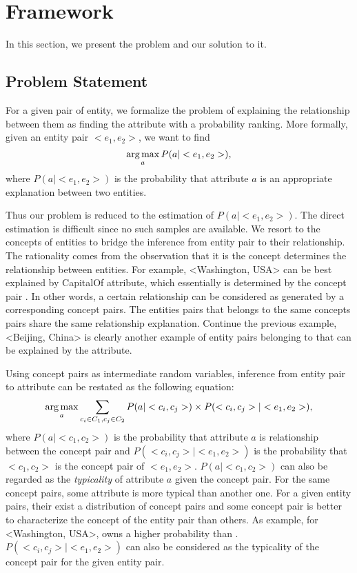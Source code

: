 
\section{Framework}


In this section, we present the problem and our solution to it.

\subsection{Problem Statement}

For a given pair of entity, we formalize the problem of explaining the relationship between them as finding the attribute with a probability ranking. More formally, given an entity pair $<e_1, e_2>$, we want to find 
$$\operatorname*{arg\,max}_a P(a|<e_1,e_2>),$$
where $P(a|<e_1, e_2>)$ is the probability that attribute $a$ is an appropriate explanation between two entities. 

Thus our problem is reduced to the estimation of $P(a|<e_1, e_2>)$. The direct estimation is difficult since no such samples are available. We resort to the concepts of entities to bridge the inference from entity pair to their relationship.  The rationality comes from the observation that it is the concept determines the relationship between entities. For example, \ac{<Washington, USA>} can be best explained by \ac{CapitalOf} attribute, which essentially is determined by the concept pair . In other words, a certain relationship can be considered as generated by a corresponding concept pairs.  The entities pairs that belongs to the same concepts pairs share the same relationship explanation. Continue the previous example, \ac{<Beijing, China>} is clearly another example of entity pairs belonging to  that can be explained by the  attribute.

Using concept pairs as intermediate random variables, inference from entity pair to attribute can be restated as the following equation:
\begin{equation}
\label{eq:target}
\operatorname*{arg\,max}_a \sum_{c_i\in C_1 , c_j \in C_2 }P(a|<c_{i},c_{j}>)\times P(<c_{i},c_{j}>|<e_{1},e_{2}>),
\end{equation}
where $P(a|<c_{1},c_{2}>)$ is the probability that attribute $a$ is relationship between the concept pair and 
$P(<c_{i},c_{j}>|<e_{1},e_{2}>)$ is the probability that $<c_1, c_2>$ is the concept pair of $<e_1, e_2>$.  $P(a|<c_{1},c_{2}>)$ can also be regarded as the {\it typicality} of attribute $a$ given the concept pair. For the same concept pairs, some attribute is more typical than another one. 
For a given entity pairs, their exist a distribution of concept pairs and some concept pair is better to characterize the concept of the entity pair than others. As example,  for \ac{<Washington, USA>},   owns a higher probability than .  $P(<c_{i},c_{j}>|<e_{1},e_{2}>)$ can also be considered as the typicality of the concept pair for the given entity pair.

